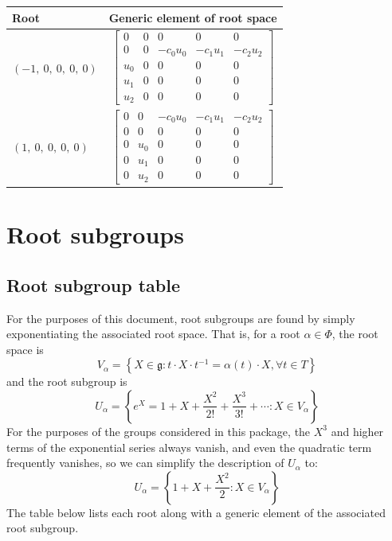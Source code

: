 \documentclass[11pt]{article}
\newcommand{\noi}{\noindent}
\newcommand{\inv}{^{-1}}
\newcommand{\lb}{\left\{}
\newcommand{\rb}{\right\}}
\newcommand{\frakg}{\mathfrak{g}}
\theoremstyle{definition}
\begin{document}
\noindent \begin{longtable}{|l|c|}
    \hline
    \textbf{Root} & \textbf{Generic element of root space} \\
    \hline
    \endhead
    $\left( -1, \  0, \  0, \  0, \  0\right)$ & ${\left[\begin{matrix}0 & 0 & 0 & 0 & 0\\0 & 0 & - c_{0} u_{0} & - c_{1} u_{1} & - c_{2} u_{2}\\u_{0} & 0 & 0 & 0 & 0\\u_{1} & 0 & 0 & 0 & 0\\u_{2} & 0 & 0 & 0 & 0\end{matrix}\right]}$ \\
    \hline
    $\left( 1, \  0, \  0, \  0, \  0\right)$ & ${\left[\begin{matrix}0 & 0 & - c_{0} u_{0} & - c_{1} u_{1} & - c_{2} u_{2}\\0 & 0 & 0 & 0 & 0\\0 & u_{0} & 0 & 0 & 0\\0 & u_{1} & 0 & 0 & 0\\0 & u_{2} & 0 & 0 & 0\end{matrix}\right]}$ \\
    \hline
\end{longtable}


\newpage
\section{Root subgroups}

\subsection{Root subgroup table}

\noi For the purposes of this document, root subgroups are found by simply exponentiating the associated root space. That is, for a root $\alpha \in \Phi$, the root space is
\[
	V_\alpha = \lb X \in \frakg : t \cdot X \cdot t \inv = \alpha(t) \cdot X, \forall t \in T \rb
\]
and the root subgroup is
\[
	U_\alpha = \lb e^X = 1 + X + \frac{X^2}{2!} + \frac{X^3}{3!} + \cdots : X \in V_\alpha \rb
\]
For the purposes of the groups considered in this package, the $X^3$ and higher terms of the exponential series always vanish, and even the quadratic term frequently vanishes, so we can simplify the description of $U_\alpha$ to:
\[
	U_\alpha = \lb 1 + X + \frac{X^2}{2} : X \in V_\alpha \rb
\]
The table below lists each root along with a generic element of the associated root subgroup.
\end{document}
